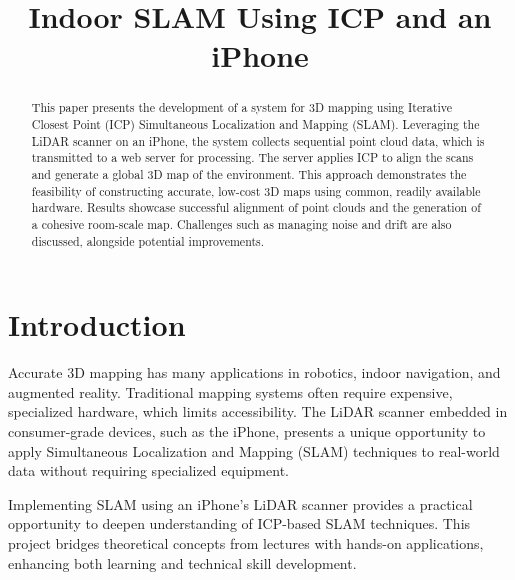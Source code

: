 \documentclass[conference]{IEEEtran}
\begin{document}
    \title{Indoor SLAM Using ICP and an iPhone}

    \author{
    }

    \maketitle

    \begin{abstract}
        This paper presents the development of a system for 3D mapping using Iterative Closest Point
        (ICP) Simultaneous Localization and Mapping (SLAM). Leveraging the LiDAR scanner on an
        iPhone, the system collects sequential point cloud data, which is transmitted to a web
        server for processing.
        The server applies ICP to align the scans and generate a global 3D map of the environment.
        This approach demonstrates the feasibility of constructing accurate, low-cost 3D maps
        using common, readily available hardware.
        Results showcase successful alignment of point clouds and the generation of a cohesive room-scale map.
        Challenges such as managing noise and drift are also discussed, alongside potential improvements.
    \end{abstract}



    \section{Introduction}
    Accurate 3D mapping has many applications in robotics, indoor navigation, and augmented reality.
    Traditional mapping systems often require expensive, specialized hardware, which limits accessibility.
    The LiDAR scanner embedded in consumer-grade devices, such as the iPhone, presents a unique opportunity
    to apply Simultaneous Localization and Mapping (SLAM) techniques to real-world data without requiring
    specialized equipment.

    Implementing SLAM using an iPhone's LiDAR scanner provides a practical opportunity to deepen
    understanding of ICP-based SLAM techniques.
    This project bridges theoretical concepts from lectures with hands-on applications,
    enhancing both learning and technical skill development.
\end{document}
